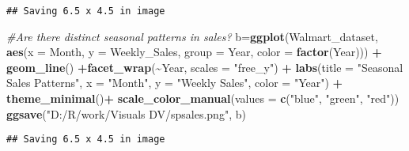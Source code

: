 \documentclass[
]{article}
\newenvironment{Shaded}{\begin{snugshade}}{\end{snugshade}}
\newcommand{\AttributeTok}[1]{\textcolor[rgb]{0.13,0.29,0.53}{#1}}
\newcommand{\CommentTok}[1]{\textcolor[rgb]{0.56,0.35,0.01}{\textit{#1}}}
\newcommand{\FunctionTok}[1]{\textcolor[rgb]{0.13,0.29,0.53}{\textbf{#1}}}
\newcommand{\NormalTok}[1]{#1}
\newcommand{\OtherTok}[1]{\textcolor[rgb]{0.56,0.35,0.01}{#1}}
\newcommand{\SpecialCharTok}[1]{\textcolor[rgb]{0.81,0.36,0.00}{\textbf{#1}}}
\newcommand{\StringTok}[1]{\textcolor[rgb]{0.31,0.60,0.02}{#1}}
\begin{document}
\begin{verbatim}
## Saving 6.5 x 4.5 in image
\end{verbatim}

\begin{Shaded}
\begin{Highlighting}[]
\CommentTok{\#Are there distinct seasonal patterns in sales?}
\NormalTok{b}\OtherTok{=}\FunctionTok{ggplot}\NormalTok{(Walmart\_dataset, }\FunctionTok{aes}\NormalTok{(}\AttributeTok{x =}\NormalTok{ Month, }\AttributeTok{y =}\NormalTok{ Weekly\_Sales, }
                              \AttributeTok{group =}\NormalTok{ Year, }\AttributeTok{color =} \FunctionTok{factor}\NormalTok{(Year))) }\SpecialCharTok{+}
  \FunctionTok{geom\_line}\NormalTok{() }\SpecialCharTok{+}\FunctionTok{facet\_wrap}\NormalTok{(}\SpecialCharTok{\textasciitilde{}}\NormalTok{Year, }\AttributeTok{scales =} \StringTok{"free\_y"}\NormalTok{) }\SpecialCharTok{+}
  \FunctionTok{labs}\NormalTok{(}\AttributeTok{title =} \StringTok{"Seasonal Sales Patterns"}\NormalTok{,}
       \AttributeTok{x =} \StringTok{"Month"}\NormalTok{,}
       \AttributeTok{y =} \StringTok{"Weekly Sales"}\NormalTok{,}
       \AttributeTok{color =} \StringTok{"Year"}\NormalTok{) }\SpecialCharTok{+}
  \FunctionTok{theme\_minimal}\NormalTok{()}\SpecialCharTok{+}  \FunctionTok{scale\_color\_manual}\NormalTok{(}\AttributeTok{values =} \FunctionTok{c}\NormalTok{(}\StringTok{"blue"}\NormalTok{, }\StringTok{"green"}\NormalTok{, }\StringTok{"red"}\NormalTok{))}
\FunctionTok{ggsave}\NormalTok{(}\StringTok{"D:/R/work/Visuals DV/spsales.png"}\NormalTok{, b)}
\end{Highlighting}
\end{Shaded}

\begin{verbatim}
## Saving 6.5 x 4.5 in image
\end{verbatim}
\end{document}
